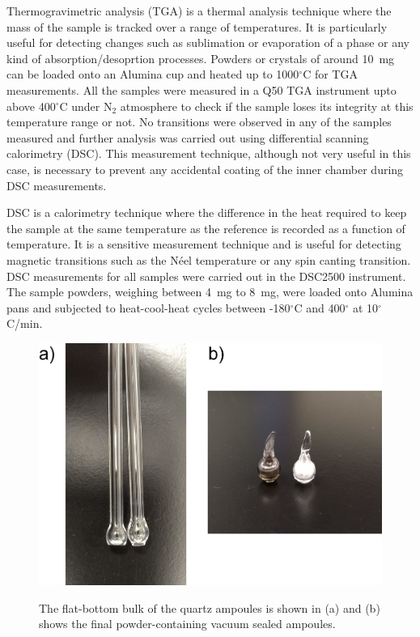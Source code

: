\documentclass[letterpaper,10pt,doublespacing,edeposit]{uiucthesis2020}
\begin{document}
\begin{mainmatter}
Thermogravimetric analysis (TGA) is a thermal analysis technique where the mass of the sample is tracked over a range of temperatures. It is particularly useful for detecting changes such as sublimation or evaporation of a phase or any kind of absorption/desoprtion processes. Powders or crystals of around 10~mg can be loaded onto an Alumina cup and heated up to 1000$^\circ$C for TGA measurements. All the samples were measured in a Q50 TGA instrument upto above 400$^\circ$C under N$_2$ atmosphere to check if the sample loses its integrity at this temperature range or not. No transitions were observed in any of the samples measured and further analysis was carried out using differential scanning calorimetry (DSC). This measurement technique, although not very useful in this case, is necessary to prevent any accidental coating of the inner chamber during DSC measurements.

DSC is a calorimetry technique where the difference in the heat required to keep the sample at the same temperature as the reference is recorded as a function of temperature. It is a sensitive measurement technique and is useful for detecting magnetic transitions such as the N\'eel temperature or any spin canting transition. DSC measurements for all samples were carried out in the DSC2500 instrument. The sample powders, weighing between 4~mg to 8~mg, were loaded onto Alumina pans and subjected to heat-cool-heat cycles between -180$^\circ$C and 400$^\circ$ at 10$^\circ$C/min.

\begin{figure}
\centering\includegraphics[width=0.6\columnwidth]{figures/ch3/DTA_tubes_combined.jpg} \\
\caption{\label{fig:DTA_tubes_combined}
The flat-bottom bulk of the quartz ampoules is shown in (a) and (b) shows the final powder-containing vacuum sealed ampoules.
}
\end{figure}


\end{mainmatter}
\end{document}
